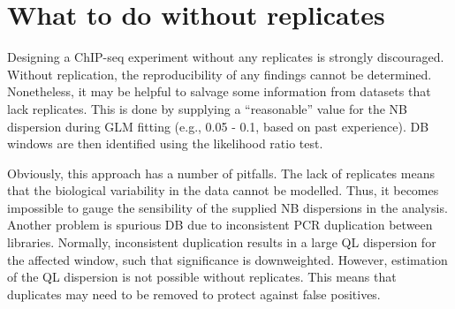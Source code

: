 \documentclass{report}\usepackage[]{graphicx}\usepackage[usenames,dvipsnames]{color}
\newcommand{\hlnum}[1]{\textcolor[rgb]{0.816,0.125,0.439}{#1}}%
\newcommand{\hlopt}[1]{\textcolor[rgb]{0,0,0}{#1}}%
\newcommand{\hlstd}[1]{\textcolor[rgb]{0.251,0.251,0.251}{#1}}%
\newcommand{\hlkwb}[1]{\textcolor[rgb]{0,0,0}{#1}}%
\newcommand{\hlkwc}[1]{\textcolor[rgb]{0.251,0.251,0.251}{#1}}%
\newcommand{\hlkwd}[1]{\textcolor[rgb]{0.878,0.439,0.125}{#1}}%
\newenvironment{knitrout}{}{} %
\begin{document}
\section{What to do without replicates}
Designing a ChIP-seq experiment without any replicates is strongly discouraged.
Without replication, the reproducibility of any findings cannot be determined. 
Nonetheless, it may be helpful to salvage some information from datasets that lack replicates.
This is done by supplying a ``reasonable'' value for the NB dispersion during GLM fitting (e.g., 0.05 - 0.1, based on past experience).
DB windows are then identified using the likelihood ratio test.

\begin{knitrout}
\color{fgcolor}
\end{knitrout}

Obviously, this approach has a number of pitfalls. 
The lack of replicates means that the biological variability in the data cannot be modelled.
Thus, it becomes impossible to gauge the sensibility of the supplied NB dispersions in the analysis.
Another problem is spurious DB due to inconsistent PCR duplication between libraries.
Normally, inconsistent duplication results in a large QL dispersion for the affected window, such that significance is downweighted.
However, estimation of the QL dispersion is not possible without replicates.
This means that duplicates may need to be removed to protect against false positives.
\end{document}
